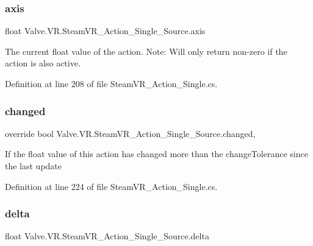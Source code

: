 \subsubsection{\texorpdfstring{axis}{axis}}
{\footnotesize\ttfamily float Valve.\+V\+R.\+Steam\+V\+R\+\_\+\+Action\+\_\+\+Single\+\_\+\+Source.\+axis\hspace{0.3cm}{\ttfamily [get]}}



The current float value of the action. Note\+: Will only return non-\/zero if the action is also active. 



Definition at line 208 of file Steam\+V\+R\+\_\+\+Action\+\_\+\+Single.\+cs.

\mbox{\label{class_valve_1_1_v_r_1_1_steam_v_r___action___single___source_a665f62ee0d4069dff8f939ba854017dd}} 
\subsubsection{\texorpdfstring{changed}{changed}}
{\footnotesize\ttfamily override bool Valve.\+V\+R.\+Steam\+V\+R\+\_\+\+Action\+\_\+\+Single\+\_\+\+Source.\+changed\hspace{0.3cm}{\ttfamily [get]}, {}}



If the float value of this action has changed more than the change\+Tolerance since the last update 



Definition at line 224 of file Steam\+V\+R\+\_\+\+Action\+\_\+\+Single.\+cs.

\mbox{\label{class_valve_1_1_v_r_1_1_steam_v_r___action___single___source_a611617683e15ab0a8bba6de8a637c852}} 
\subsubsection{\texorpdfstring{delta}{delta}}
{\footnotesize\ttfamily float Valve.\+V\+R.\+Steam\+V\+R\+\_\+\+Action\+\_\+\+Single\+\_\+\+Source.\+delta\hspace{0.3cm}{\ttfamily [get]}}



